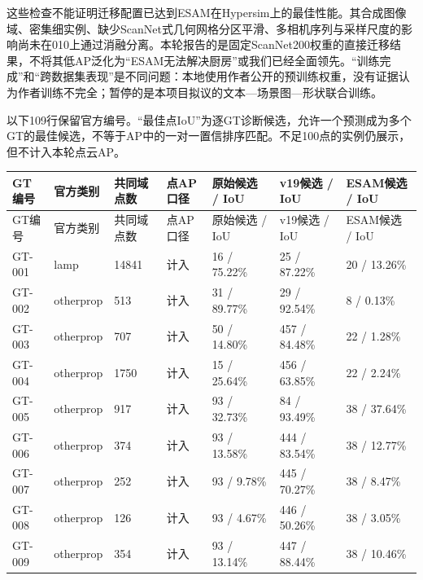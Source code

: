 \documentclass[UTF8,fontset=fandol]{ctexart}
\begin{document}
这些检查不能证明迁移配置已达到ESAM在Hypersim上的最佳性能。其合成图像域、密集细实例、缺少ScanNet式几何网格分区平滑、多相机序列与采样尺度的影响尚未在010上通过消融分离。本轮报告的是固定ScanNet200权重的直接迁移结果，不将其低AP泛化为“ESAM无法解决厨房”或我们已经全面领先。“训练完成”和“跨数据集表现”是不同问题：本地使用作者公开的预训练权重，没有证据认为作者训练不完全；暂停的是本项目拟议的文本—场景图—形状联合训练。



以下109行保留官方编号。“最佳点IoU”为逐GT诊断候选，允许一个预测成为多个GT的最佳候选，不等于AP中的一对一置信排序匹配。不足100点的实例仍展示，但不计入本轮点云AP。



{\small
\begin{longtable}{|p{}|p{}|p{}|p{}|p{}|p{}|p{}|}
\hline
GT编号 & 官方类别 & 共同域点数 & 点AP口径 & 原始候选 / IoU & v19候选 / IoU & ESAM候选 / IoU \\ \hline
\endfirsthead
\hline
GT编号 & 官方类别 & 共同域点数 & 点AP口径 & 原始候选 / IoU & v19候选 / IoU & ESAM候选 / IoU \\ \hline
\endhead
GT-001 & lamp & 14841 & 计入 & 16 / 75.22\% & 25 / 87.22\% & 20 / 13.26\% \\ \hline
GT-002 & otherprop & 513 & 计入 & 31 / 89.77\% & 29 / 92.54\% & 8 / 0.13\% \\ \hline
GT-003 & otherprop & 707 & 计入 & 50 / 14.80\% & 457 / 84.48\% & 22 / 1.28\% \\ \hline
GT-004 & otherprop & 1750 & 计入 & 15 / 25.64\% & 456 / 63.85\% & 22 / 2.24\% \\ \hline
GT-005 & otherprop & 917 & 计入 & 93 / 32.73\% & 84 / 93.49\% & 38 / 37.64\% \\ \hline
GT-006 & otherprop & 374 & 计入 & 93 / 13.58\% & 444 / 83.54\% & 38 / 12.77\% \\ \hline
GT-007 & otherprop & 252 & 计入 & 93 / 9.78\% & 445 / 70.27\% & 38 / 8.47\% \\ \hline
GT-008 & otherprop & 126 & 计入 & 93 / 4.67\% & 446 / 50.26\% & 38 / 3.05\% \\ \hline
GT-009 & otherprop & 354 & 计入 & 93 / 13.14\% & 447 / 88.44\% & 38 / 10.46\% \\ \hline

\end{longtable}}
\end{document}
